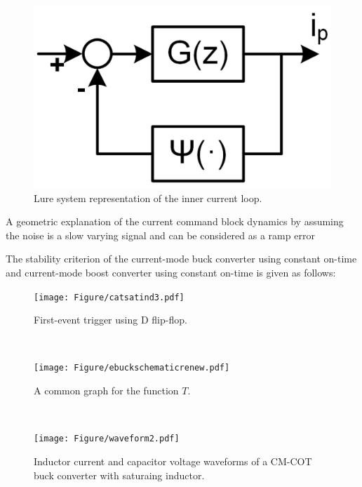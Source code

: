 \begin{figure}
\begin{minipage}{0.32\textwidth}
\end{minipage}
~
\begin{minipage}{0.32\textwidth}
    \centering
    \includegraphics[width=\textwidth]{Figure/section2/luresystem.PNG}
    \caption{\label{fig:luresystem} Lure system representation of the inner current loop.}
\end{minipage}
\end{figure}


A geometric explanation of the current command block dynamics by assuming the noise is a slow varying signal and can be considered as a ramp error


The stability criterion of the current-mode buck converter using constant on-time and current-mode boost converter using constant on-time is given as follows:


\begin{figure}
\begin{minipage}{0.32\textwidth}
    \centering
    \texttt{[image: Figure/catsatind3.pdf]}
    \caption{ \label{catonsatind} First-event trigger using D flip-flop.}
\end{minipage}
~
\begin{minipage}{0.32\textwidth}
    \centering
    \texttt{[image: Figure/ebuckschematicrenew.pdf]}
  \caption{  \label{circuitdiagram} A common graph for the function $T$.}
\end{minipage}
~
\begin{minipage}{0.32\textwidth}
    \centering
    \texttt{[image: Figure/waveform2.pdf]}
    \caption{\label{eboostderivation} Inductor current and capacitor voltage waveforms of a CM-COT buck converter with saturaing inductor.}
\end{minipage}
\end{figure}




